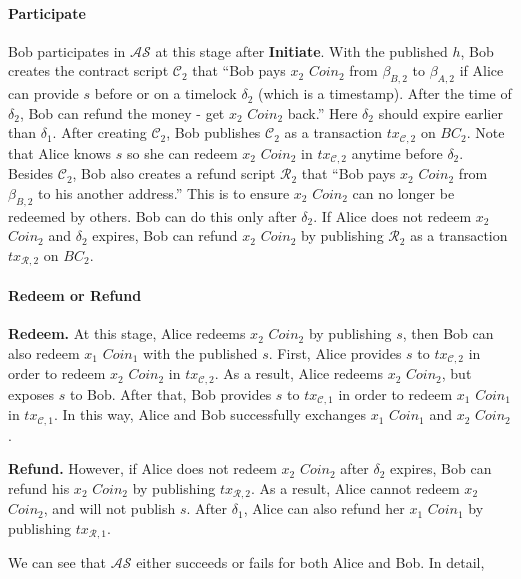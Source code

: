 \paragraph{\textbf{Participate}}
Bob participates in $\mathcal{AS}$ at this stage after \textbf{Initiate}.
With the published $h$, Bob creates the contract script $\mathcal{C}_2$ that ``Bob pays $x_2$ $Coin_2$ from $\beta_{B, 2}$ to $\beta_{A, 2}$ if Alice can provide $s$ before or on a timelock $\delta_2$ (which is a timestamp). After the time of $\delta_2$, Bob can refund the money - get $x_2$ $Coin_2$ back.''
Here $\delta_2$ should expire earlier than $\delta_1$.
After creating $\mathcal{C}_2$, Bob publishes $\mathcal{C}_2$ as a transaction $tx_{\mathcal{C}, 2}$ on $BC_2$.
Note that Alice knows $s$ so she can redeem $x_2$ $Coin_2$ in $tx_{\mathcal{C}, 2}$ anytime before $\delta_2$.
Besides $\mathcal{C}_2$, Bob also creates a refund script $\mathcal{R}_2$ that ``Bob pays $x_2$ $Coin_2$ from $\beta_{B, 2}$ to his another address.''
This is to ensure $x_2$ $Coin_2$ can no longer be redeemed by others. Bob can do this only after $\delta_2$.
If Alice does not redeem $x_2$ $Coin_2$ and $\delta_2$ expires, Bob can refund $x_2$ $Coin_2$ by publishing $\mathcal{R}_2$ as a transaction $tx_{\mathcal{R}, 2}$ on $BC_2$.

\paragraph{\textbf{Redeem} or \textbf{Refund}}

\textbf{Redeem.}
At this stage, Alice redeems $x_2$ $Coin_2$ by publishing $s$, then Bob can also redeem $x_1$ $Coin_1$ with the published $s$.
First, Alice provides $s$ to $tx_{\mathcal{C}, 2}$ in order to redeem $x_2$ $Coin_2$ in $tx_{\mathcal{C}, 2}$.
As a result, Alice redeems $x_2$ $Coin_2$, but exposes $s$ to Bob.
After that, Bob provides $s$ to $tx_{\mathcal{C}, 1}$ in order to redeem $x_1$ $Coin_1$ in $tx_{\mathcal{C}, 1}$.
In this way, Alice and Bob successfully exchanges $x_1$ $Coin_1$ and $x_2$ $Coin_2$.

\textbf{Refund.}
However, if Alice does not redeem $x_2$ $Coin_2$ after $\delta_2$ expires, Bob can refund his $x_2$ $Coin_2$ by publishing $tx_{\mathcal{R}, 2}$.
As a result, Alice cannot redeem $x_2$ $Coin_2$, and will not publish $s$.
After $\delta_1$, Alice can also refund her $x_1$ $Coin_1$ by publishing $tx_{\mathcal{R}, 1}$.


We can see that $\mathcal{AS}$ either succeeds or fails for both Alice and Bob.
In detail,

